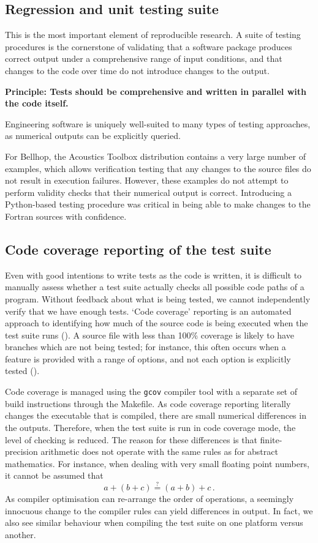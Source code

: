 \documentclass[twocolumn]{willarticle}
\newcommand\Principle[1]{\begin{framed}\bfseries Principle: #1\end{framed}}
\begin{document}
\subsection{Regression and unit testing suite}

This is the most important element of reproducible research.
A suite of testing procedures is the cornerstone of validating that a software package produces correct output under a comprehensive range of input conditions, and that changes to the code over time do not introduce changes to the output.

\Principle{Tests should be comprehensive and written in parallel with the code itself.}

Engineering software is uniquely well-suited to many types of testing approaches, as numerical outputs can be explicitly queried.

For Bellhop, the Acoustics Toolbox distribution contains a very large number of examples, which allows verification testing that any changes to the source files do not result in execution failures.
However, these examples do not attempt to perform validity checks that their numerical output is correct.
Introducing a Python-based testing procedure was critical in being able to make changes to the Fortran sources with confidence. 

\subsection{Code coverage reporting of the test suite}

Even with good intentions to write tests as the code is written, it is difficult to manually assess whether a test suite actually checks all possible code paths of a program.
Without feedback about what is being tested, we cannot independently verify that we have enough tests.
`Code coverage' reporting is an automated approach to identifying how much of the source code is being executed when the test suite runs ().
A source file with less than 100\% coverage is likely to have branches which are not being tested; for instance, this often occurs when a feature is provided with a range of options, and not each option is explicitly tested (). 

Code coverage is managed using the \verb|gcov| compiler tool with a separate set of build instructions through the Makefile.
As code coverage reporting literally changes the executable that is compiled, there are small numerical differences in the outputs.
Therefore, when the test suite is run in code coverage mode, the level of checking is reduced.
The reason for these differences is that finite-precision arithmetic does not operate with the same rules as for abstract mathematics.
For instance, when dealing with very small floating point numbers, it cannot be assumed that
\[
  a + (b + c) \mathop{=}\limits^{?} (a + b) + c \,.
\]
As compiler optimisation can re-arrange the order of operations, a seemingly innocuous change to the compiler rules can yield differences in output.
In fact, we also see similar behaviour when compiling the test suite on one platform versus another.
\end{document}

